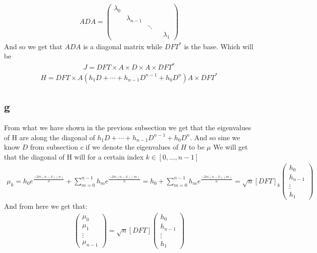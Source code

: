 \documentclass[english]{extarticle}
\numberwithin{equation}{section}
\numberwithin{figure}{section}
\begin{document}
\begin{align}
    A D A = \begin{pmatrix}
        \lambda_{0} & & &\\ & \lambda_{n-1} & & \\ & & \ddots & \\ & & & &\lambda_{1}
    \end{pmatrix}
\end{align}
And so we get that $ADA$ is a diagonal matrix while $DFT^{*}$ is the base. Which will be
\begin{align}
    J = DFT \times A \times D \times A \times DFT^{*}
\end{align}
\begin{align}
    H = DFT \times A (h_{1}D + \cdots + h_{n-1}D^{n-1}+h_{0}D^{n}) A \times DFT^{*}
\end{align}
\subsection*{g}
From what we have shown in the previous subsection we get that the eigenvalues of H are along the diagonal of $h_{1}D + \cdots + h_{n-1}D^{n-1}+h_{0}D^{n}$. And so sine we know $D$ from subsection c if we denote the eigenvalues of $H$ to be $\mu$ We will get that the diagonal of H will for a certain index $k \in [0,...,n-1]$
\begin{align}
    \mu_{k}= h_{0}e^{\frac{-2 \pi i (n-k)(n)}{n}} + \sum_{m=0}^{n-1} h_{m}e^{\frac{-2 \pi i (n-k)(m)}{n}} = h_{0} + \sum_{m=0}^{n-1} h_{m}e^{\frac{-2 \pi i (n-k)(m)}{n}} = \sqrt{n}[DFT]_{k} \begin{pmatrix}
        h_0 \\ h_{n-1} \\ \vdots \\ h_1
    \end{pmatrix}
\end{align}
And from here we get that:
\begin{align}
    \begin{pmatrix}
        \mu_{0} \\ \mu_{1} \\ \vdots \\ \mu_{n-1}
    \end{pmatrix} = \sqrt{n}[DFT] \begin{pmatrix}
        h_0 \\ h_{n-1} \\ \vdots \\ h_1
    \end{pmatrix}
\end{align}
\end{document}
